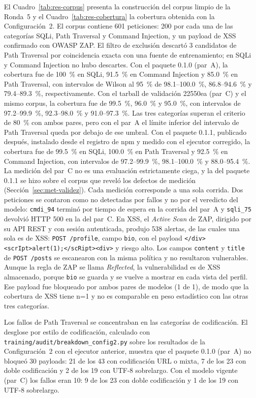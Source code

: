 El Cuadro~\ref{tab:res-corpus} presenta la construcción del corpus limpio de la Ronda~5 y el
Cuadro~\ref{tab:res-cobertura} la cobertura obtenida con la Configuración~2. El corpus contiene 601
peticiones: 200 por cada una de las categorías SQLi, Path Traversal y Command Injection, y un
payload de XSS confirmado con OWASP ZAP. El filtro de exclusión descartó 3 candidatos de Path Traversal por
coincidencia exacta con una fuente de entrenamiento; en SQLi y Command Injection no hubo descartes.
Con el paquete 0.1.0 (par~A), la cobertura fue de 100~\% en SQLi, 91.5~\% en Command Injection
y 85.0~\% en Path Traversal, con intervalos de Wilson \cite{wilson1927probable} al 95~\% de 98.1--100.0~\%, 86.8--94.6~\% y
79.4--89.3~\%, respectivamente. Con el tarball de validación 22550ea (par~C) y el mismo corpus, la
cobertura fue de 99.5~\%, 96.0~\% y 95.0~\%, con intervalos de 97.2--99.9~\%, 92.3--98.0~\% y
91.0--97.3~\%. Las tres categorías superan el criterio de 80~\% con ambos pares, pero con el par~A
el límite inferior del intervalo de Path Traversal queda por debajo de ese umbral. Con el paquete
0.1.1, publicado después, instalado desde el registro de npm y medido con el ejecutor corregido, la
cobertura fue de 99.5~\% en SQLi, 100.0~\% en Path Traversal y 92.5~\% en Command Injection, con
intervalos de 97.2--99.9~\%, 98.1--100.0~\% y 88.0--95.4~\%. La medición del par~C no es una
evaluación estrictamente ciega, y la del paquete 0.1.1 se hizo sobre el corpus que reveló los
defectos de medición (Sección~\ref{sec:met-validez}). Cada medición corresponde a una sola corrida.
Dos peticiones se contaron como no detectadas por fallos y no por el veredicto del modelo:
\texttt{cmdi\_94} terminó por tiempo de espera en la corrida del par~A y \texttt{sqli\_75} devolvió
HTTP 500 en la del par~C. En XSS, el \textit{Active Scan} de ZAP, dirigido por su API REST y con
sesión autenticada, produjo 538 alertas, de las cuales una sola es de XSS: \texttt{POST /profile},
campo \texttt{bio}, con el payload \texttt{</div><scrIpt>alert(1);</scRipt><div>} y riesgo alto.
Los campos \texttt{content} y \texttt{title} de \texttt{POST /posts} se escanearon con la misma
política y no resultaron vulnerables. Aunque la regla de ZAP se llama \textit{Reflected}, la
vulnerabilidad es de XSS almacenado, porque \texttt{bio} se guarda y se vuelve a mostrar en cada
vista del perfil. Ese payload fue bloqueado por ambos pares de modelos (1 de 1), de modo que la
cobertura de XSS tiene n=1 y no es comparable en peso estadístico con las otras tres categorías.

Los fallos de Path Traversal se concentraban en las categorías de codificación. El desglose por
estilo de codificación, calculado con \texttt{training/audit/breakdown\_config2.py} sobre los
resultados de la Configuración~2 con el ejecutor anterior, muestra que el paquete 0.1.0 (par~A) no
bloqueó 30 payloads: 21 de los 43 con codificación URL o mixta, 7 de los 23 con doble codificación
y 2 de los 19 con UTF-8 sobrelargo. Con el modelo vigente (par~C) los fallos eran 10: 9 de los 23
con doble codificación y 1 de los 19 con UTF-8 sobrelargo.

